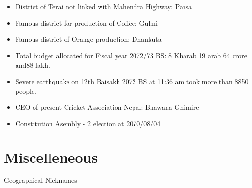 \documentclass[
  openany]{book}
\begin{document}
\begin{itemize}
\item
  District of Terai not linked with Mahendra Highway: Parsa
\item
  Famous district for production of Coffee: Gulmi
\item
  Famous district of Orange production: Dhankuta
\item
  Total budget allocated for Fiscal year 2072/73 BS: 8 Kharab 19 arab 64 crore and88 lakh.
\item
  Severe earthquake on 12th Baisakh 2072 BS at 11:36 am took more than 8850 people.
\item
  CEO of present Cricket Association Nepal: Bhawana Ghimire
\item
  Constitution Asembly - 2 election at 2070/08/04
\end{itemize}

\hypertarget{miscelleneous}{%
\section{Miscelleneous}\label{miscelleneous}}

Geographical Nicknames
\end{document}
